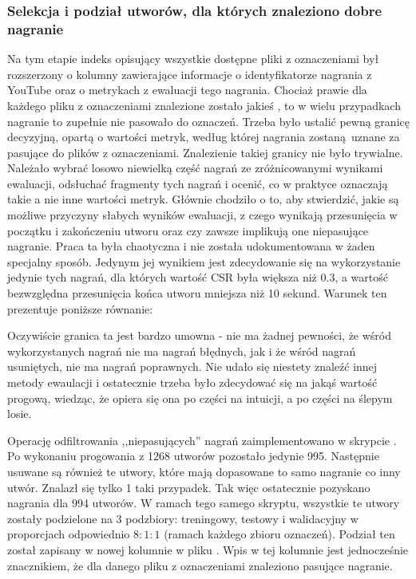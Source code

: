 \subsubsection{Selekcja i podział utworów, dla których znaleziono dobre nagranie}
Na tym etapie indeks opisujący wszystkie dostępne pliki z oznaczeniami był rozszerzony o kolumny
zawierające informacje o identyfikatorze nagrania z YouTube oraz o metrykach z ewaluacji tego
nagrania. Chociaż prawie dla każdego pliku z oznaczeniami znalezione zostało jakieś
, to w wielu przypadkach nagranie to zupełnie nie pasowało do oznaczeń. Trzeba było
ustalić pewną granicę decyzyjną, opartą o wartości metryk, według której nagrania zostaną uznane za
pasujące do plików z oznaczeniami. Znalezienie takiej granicy nie było trywialne. Należało wybrać
losowo niewielką część nagrań ze zróżnicowanymi wynikami ewaluacji, odsłuchać fragmenty tych nagrań
i ocenić, co w praktyce oznaczają takie a nie inne wartości metryk. Głównie chodziło o to, aby
stwierdzić, jakie są możliwe przyczyny słabych wyników ewaluacji, z czego wynikają przesunięcia w
początku i zakończeniu utworu oraz czy zawsze implikują one niepasujące nagranie. Praca ta była
chaotyczna i nie została udokumentowana w żaden specjalny sposób. Jedynym jej wynikiem jest
zdecydowanie się na wykorzystanie jedynie tych nagrań, dla których wartość CSR była większa niż
0.3, a wartość bezwzględna przesunięcia końca utworu mniejsza niż 10 sekund. Warunek ten prezentuje
poniższe równanie:
\begin{center}
\end{center}
Oczywiście granica ta jest bardzo umowna - nie ma żadnej pewności, że wśród wykorzystanych nagrań
nie ma nagrań błędnych, jak i że wśród nagrań usuniętych, nie ma nagrań poprawnych. Nie udało się
niestety znaleźć innej metody ewaulacji i ostatecznie trzeba było zdecydować się na jakąś wartość
progową, wiedząc, że opiera się ona po części na intuicji, a po części na ślepym losie.

Operację odfiltrowania ,,niepasujących'' nagrań zaimplementowano w skrypcie
. Po wykonaniu progowania z 1268 utworów
pozostało jedynie 995. Następnie usuwane są również te utwory, które mają dopasowane to samo
nagranie co inny utwór. Znalazł się tylko 1 taki przypadek. Tak więc ostatecznie pozyskano nagrania
dla 994 utworów. W ramach tego samego skryptu, wszystkie te utwory zostały podzielone na 3
podzbiory: treningowy, testowy i walidacyjny w proporcjach odpowiednio $8:1:1$ (ramach każdego
zbioru oznaczeń). Podział ten został zapisany w nowej kolumnie  w pliku
. Wpis w tej kolumnie jest jednocześnie znacznikiem, że dla danego pliku z
oznaczeniami znaleziono pasujące nagranie.

